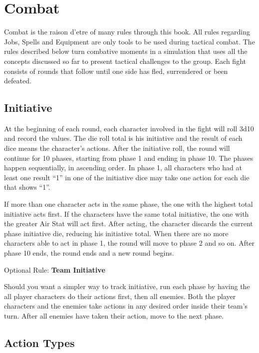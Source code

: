 
\section{Combat}\label{sec:combat}
\begin{multicols}{2}
Combat is the raison d’etre of many rules through this book. All rules regarding Jobs, Spells and Equipment are only tools to be used during tactical combat. The rules described below turn combative moments in a simulation that uses all the concepts discussed so far to present tactical challenges to the group. Each fight consists of rounds that follow until one side has fled, surrendered or been defeated.

\subsection{Initiative}\label{subsec:init}
At the beginning of each round, each character involved in the fight will roll 3d10 and record the values. The die roll total is his initiative and the result of each dice means the character's actions. After the initiative roll, the round will continue for 10 phases, starting from phase 1 and ending in phase 10. The phases happen sequentially, in ascending order. In phase 1, all characters who had at least one result “1” in one of the initiative dice may take one action for each die that shows “1”.

If more than one character acts in the same phase, the one with the highest total initiative acts first. If the characters have the same total initiative, the one with the greater Air Stat will act first. After acting, the character discards the current phase initiative die, reducing his initiative total. When there are no more characters able to act in phase 1, the round will move to phase 2 and so on. After phase 10 ends, the round ends and a new round begins.

\begin{boco}
    Optional Rule: \textbf{Team Initiative}\pc%
    
    Should you want a simpler way to track initiative, run each phase by having the all player characters do their actions first, then all enemies. Both the player characters and the enemies take actions in any desired order inside their team's turn. After all enemies have taken their action, move to the next phase. 
    \end{boco}
    

\subsection{Action Types}\label{subsec:actions}

\end{multicols}
